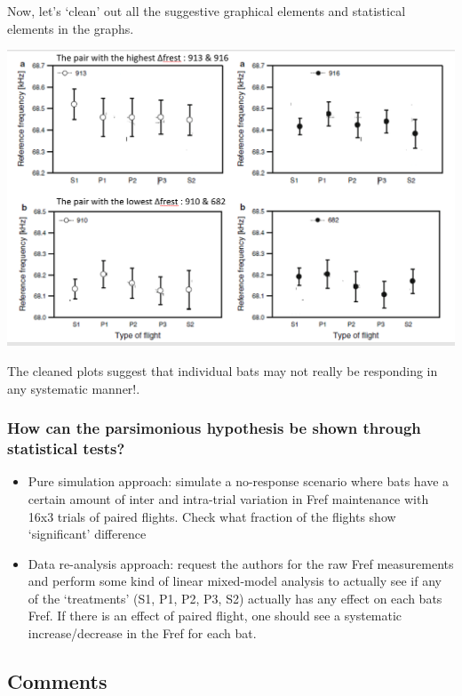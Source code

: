 \documentclass[
]{book}
\providecommand{\tightlist}{%
  \setlength{\itemsep}{0pt}\setlength{\parskip}{0pt}}
\begin{document}
Now, let's `clean' out all the suggestive graphical elements and statistical elements in the graphs.

\includegraphics{images/furusawa_etal2012_fig4_wosuggestions.PNG}

The cleaned plots suggest that individual bats may not really be responding in any systematic manner!.

\hypertarget{how-can-the-parsimonious-hypothesis-be-shown-through-statistical-tests}{%
\subsubsection{How can the parsimonious hypothesis be shown through statistical tests?}\label{how-can-the-parsimonious-hypothesis-be-shown-through-statistical-tests}}

\begin{itemize}
\tightlist
\item
  Pure simulation approach: simulate a no-response scenario where bats have a certain amount of inter and intra-trial variation in Fref maintenance with 16x3 trials of paired flights. Check what fraction of the flights show `significant' difference
\item
  Data re-analysis approach: request the authors for the raw Fref measurements and perform some kind of linear mixed-model analysis to actually see if any of the `treatments' (S1, P1, P2, P3, S2) actually has any effect on each bats Fref. If there is an effect of paired flight, one should see a systematic increase/decrease in the Fref for each bat.
\end{itemize}

\hypertarget{comments-13}{%
\subsection{Comments}\label{comments-13}}
\end{document}
